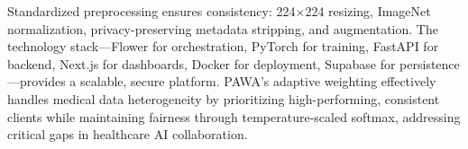 Standardized preprocessing ensures consistency: 224$\times$224 resizing, ImageNet normalization, privacy-preserving metadata stripping, and augmentation. The technology stack—Flower for orchestration, PyTorch for training, FastAPI for backend, Next.js for dashboards, Docker for deployment, Supabase for persistence—provides a scalable, secure platform. PAWA's adaptive weighting effectively handles medical data heterogeneity by prioritizing high-performing, consistent clients while maintaining fairness through temperature-scaled softmax, addressing critical gaps in healthcare AI collaboration.

